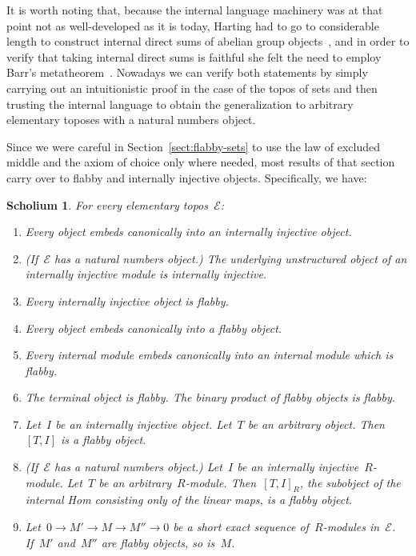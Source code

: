 \documentclass[oneside]{amsart}
\theoremstyle{definition}
\theoremstyle{plain}
\newtheorem{scholium}[defn]{Scholium}
\theoremstyle{remark}
\newcommand{\E}{\mathcal{E}}
\renewcommand{\_}{\mathpunct{.}\,}
\begin{document}
It is worth noting that, because the internal language machinery was at that
point not as well-developed as it is today, Harting had to go to considerable
length to construct internal direct sums of abelian group
objects~\cite{harting:coproduct}, and in order to verify that taking internal
direct sums is faithful she felt the need to employ Barr's
metatheorem~\cite[Theorem~1.7]{harting:effacements}. Nowadays we can verify
both statements by simply carrying out an intuitionistic proof in the case of
the topos of sets and then trusting the internal language to obtain the
generalization to arbitrary elementary toposes with a natural numbers object.

Since we were careful in Section~\ref{sect:flabby-sets} to use the law of
excluded middle and the axiom of choice only where needed, most results of that
section carry over to flabby and internally injective objects. Specifically, we
have:

\begin{scholium}\label{scholium:properties-of-flabby-objects}
For every elementary topos~$\E$:
\begin{enumerate}
\item Every object embeds canonically into an internally injective object.
\item (If~$\E$ has a natural numbers object.) The underlying unstructured
object of an internally injective module is internally injective.
\item Every internally injective object is flabby.
\item Every object embeds canonically into a flabby object.
\item Every internal module embeds canonically into an internal module which is flabby.
\item The terminal object is flabby. The binary product of flabby objects is flabby.
\item Let~$I$ be an internally injective object. Let~$T$ be an arbitrary
object. Then~$[T,I]$ is a flabby object.
\item (If~$\E$ has a natural numbers object.) Let~$I$ be an internally
injective~$R$-module. Let~$T$ be an arbitrary~$R$-module. Then~$[T,I]_R$, the
subobject of the internal Hom consisting only of the linear maps, is a flabby
object.
\item Let~$0 \to M' \to M \to M'' \to 0$ be a short exact sequence
of~$R$-modules in~$\E$. If~$M'$ and~$M''$ are flabby objects, so is~$M$.
\end{enumerate}
\end{scholium}
\end{document}
